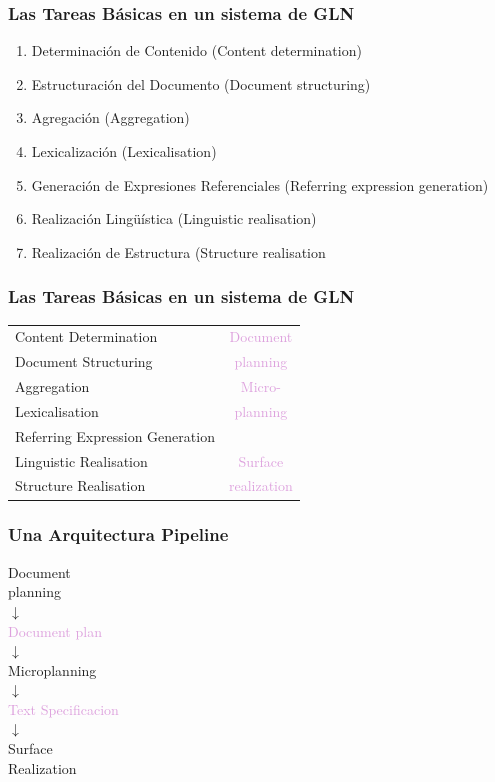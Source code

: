 \documentclass[compress,color=usenames]{beamer}
\newcommand{\mH}[1]{\textcolor{Plum}{#1}}
\begin{document}
\begin{frame}
\frametitle{Las Tareas B\'asicas en un sistema de GLN}

\begin{enumerate}
\item { { Determinaci\'on de Contenido (Content determination)}}
\item { { Estructuraci\'on del Documento (Document structuring)}}
\item { { Agregaci\'on (Aggregation)}}
\item { { Lexicalizaci\'on (Lexicalisation)}}
\item { { Generaci\'on de Expresiones Referenciales (Referring expression generation)}}
\item { { Realizaci\'on Ling\"u\'istica (Linguistic realisation)}}
\item { { Realizaci\'on de Estructura (Structure realisation}}
\end{enumerate}

\end{frame}

\begin{frame}
\frametitle{Las Tareas B\'asicas en un sistema de GLN}

\begin{center}
\begin{tabular}{|l|c|}  \hline
Content Determination & \mH{Document} \\
Document Structuring &  \mH{planning}\\ \hline
Aggregation &  \mH{Micro-}\\
Lexicalisation & \mH{planning}\\
Referring Expression Generation & \\ \hline
Linguistic Realisation & \mH{Surface}\\
Structure Realisation & \mH{realization}\\ \hline
\end{tabular}
\end{center}

\end{frame}

\begin{frame}
\frametitle{Una Arquitectura Pipeline}

\begin{center}
Document\\
planning\\
$\downarrow$\\
\mH{Document plan}\\
$\downarrow$\\
Microplanning\\
$\downarrow$\\
\mH{Text Specificacion}\\
$\downarrow$\\
Surface\\
Realization
\end{center}

\end{frame}
\end{document}
